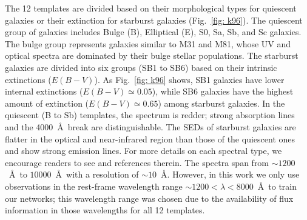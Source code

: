     The 12 templates are divided based on their morphological types for quiescent galaxies or their extinction for starburst galaxies (Fig.~\ref{fig: k96}). 
    The quiescent group of galaxies includes Bulge (B), Elliptical (E), S0, Sa, Sb, and Sc galaxies.
    The bulge group represents galaxies similar to M31 and M81, whose UV and optical spectra are dominated by their bulge stellar populations.
    The starburst galaxies are divided into six groups (SB1 to SB6) based on their intrinsic extinctions ($E(B-V)$). 
    As Fig.~\ref{fig: k96} shows, SB1 galaxies have lower internal extinctions ($E(B-V) \simeq 0.05$), while SB6 galaxies have the highest amount of extinction ($E(B-V) \simeq 0.65$) among starburst galaxies. 
    In the quiescent (B to Sb) templates, the spectrum is redder; strong absorption lines and the 4000~\AA~break are distinguishable.
    The SEDs of starburst galaxies are flatter in the optical and near-infrared region than those of the quiescent ones and show strong emission lines.
    For more details on each spectral type, we encourage readers to see  and references therein. 
   The  spectra span from $\sim1200$~\AA~to $10000$~\AA~with a resolution of $\sim 10$~\AA.
    However, in this work we only use observations in the rest-frame wavelength range $\sim1200< \lambda < 8000$~\AA~to train our networks; 
    this wavelength range was chosen due to the availability of flux information in those wavelengths for all 12 templates. 

